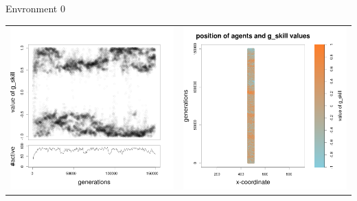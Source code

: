 \documentclass[8pt, handout=show,notes=show]{beamer}
\begin{document}
\begin{frame}{Envronment 0}
\begin{table}[H]
\centering
\begin{tabular}{cc}
\includegraphics[width=\imgSize]{../images/5StaticEnv/Gplot59_staticEnv0}&\includegraphics[width=\imgSize]{../images/5StaticEnv/Gplot59Static_staticEnv0}\\

\end{tabular}
\end{table}
\end{frame}
\end{document}
